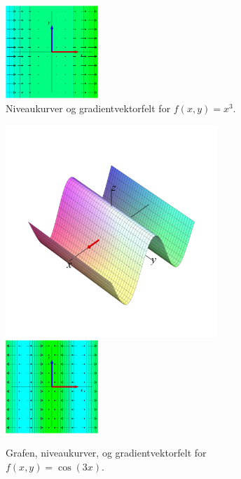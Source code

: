 \begin{figure}[ht]
\centerline{\includegraphics[height=35mm]{plotGradXitredje.pdf}}
\begin{center}
\caption{Niveaukurver og gradientvektorfelt for $f(x,y) = x^{3}$.} \label{figXitredje}
\end{center}
\end{figure}



\begin{figure}[ht]
\centerline{\includegraphics[height=80mm]{plotSurfCos3x.pdf} \quad \includegraphics[height=35mm]{plotGradcos3x.pdf}}
\begin{center}
\caption{Grafen, niveaukurver, og gradientvektorfelt for $f(x,y) = \cos(3x)$.} \label{figCos3x}
\end{center}
\end{figure}

